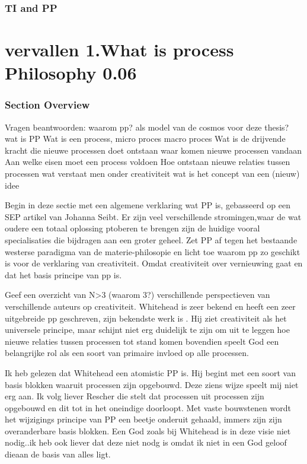 \documentclass[a4paper]{Thesis}
\begin{document}
	\subsection{TI and PP}
	
	
	

\chapter{vervallen 1.What is process Philosophy 0.06}
\subsection{Section Overview}
Vragen beantwoorden:
waarom pp? als model van de cosmos voor deze thesis?
wat is PP
Wat is een process, micro proces macro proces
Wat is de drijvende kracht die nieuwe processen doet ontstaan
waar komen nieuwe processen vandaan
Aan welke eisen moet een process voldoen
Hoe ontstaan nieuwe relaties tussen processen
wat verstaat men onder creativiteit
wat is het concept van een (nieuw) idee

Begin in deze sectie met een algemene verklaring wat PP is, gebasseerd op een SEP artikel van Johanna Seibt. Er zijn veel verschillende stromingen,waar de wat oudere een totaal oplossing ptoberen te brengen zijn de huidige vooral specialisaties die bijdragen aan een groter geheel.
Zet PP af tegen het bestaande westerse paradigma van de materie-philosopie en licht toe waarom pp zo geschikt is voor de verklaring van creativiteit. Omdat creativiteit over vernieuwing gaat en dat het basis principe van pp is.

Geef een overzicht van N>3 (waarom 3?) verschillende perspectieven van verschillende auteurs op creativiteit. Whitehead is zeer bekend en heeft een zeer uitgebreide pp geschreven, zijn bekendste werk is \cite{whitehead1929process}. Hij ziet creativiteit als het universele principe, maar schijnt niet erg duidelijk te zijn om uit te leggen hoe nieuwe relaties tussen processen tot stand komen bovendien speelt God een belangrijke rol als een soort van primaire invloed op alle processen.

Ik heb gelezen dat Whitehead een atomistic PP is. Hij begint met een soort van basis blokken waaruit processen zijn opgebouwd. Deze ziens wijze speelt mij niet erg aan. Ik volg liever Rescher die stelt dat processen uit processen zijn opgebouwd en dit tot in het oneindige doorloopt. Met vaste bouwstenen wordt het wijzigings principe van PP een beetje onderuit gehaald, immers zijn zijn overanderbare basis blokken. Een God zoals bij Whitehead is in deze visie niet nodig..ik heb ook liever dat deze niet nodg is omdat ik niet in een God geloof dieaan de basis van alles ligt.
\end{document}

